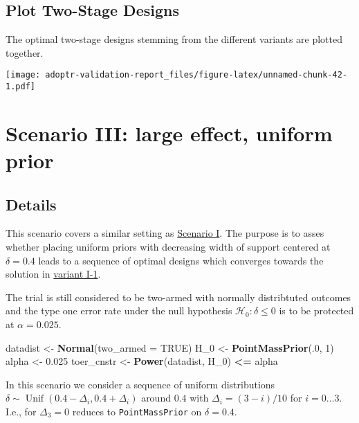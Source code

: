 \documentclass[
]{book}
\newenvironment{Shaded}{\begin{snugshade}}{\end{snugshade}}
\newcommand{\DataTypeTok}[1]{\textcolor[rgb]{0.13,0.29,0.53}{#1}}
\newcommand{\DecValTok}[1]{\textcolor[rgb]{0.00,0.00,0.81}{#1}}
\newcommand{\FloatTok}[1]{\textcolor[rgb]{0.00,0.00,0.81}{#1}}
\newcommand{\KeywordTok}[1]{\textcolor[rgb]{0.13,0.29,0.53}{\textbf{#1}}}
\newcommand{\NormalTok}[1]{#1}
\newcommand{\OperatorTok}[1]{\textcolor[rgb]{0.81,0.36,0.00}{\textbf{#1}}}
\newcommand{\OtherTok}[1]{\textcolor[rgb]{0.56,0.35,0.01}{#1}}
\newcommand{\StringTok}[1]{\textcolor[rgb]{0.31,0.60,0.02}{#1}}
\begin{document}
\hypertarget{plot-two-stage-designs-1}{%
\section{Plot Two-Stage Designs}\label{plot-two-stage-designs-1}}

The optimal two-stage designs stemming from the different variants
are plotted together.

\texttt{[image: adoptr-validation-report\_files/figure-latex/unnamed-chunk-42-1.pdf]}

\hypertarget{scenarioIII}{%
\chapter{Scenario III: large effect, uniform prior}\label{scenarioIII}}

\hypertarget{details-2}{%
\section{Details}\label{details-2}}

This scenario covers a similar setting as \protect\hyperlink{scenarioI}{Scenario I}.
The purpose is to asses whether placing uniform priors with decreasing
width of support centered at \(\delta=0.4\) leads to a sequence of
optimal designs which converges towards the solution in \protect\hyperlink{variantI.1}{variant I-1}.

The trial is still considered to be two-armed with normally distribtuted outcomes
and the type one error rate under the null hypothesis
\(\mathcal{H}_0:\delta \leq 0\) is to be protected at \(\alpha = 0.025\).

\begin{Shaded}
\begin{Highlighting}[]
\NormalTok{datadist   \textless{}{-}}\StringTok{ }\KeywordTok{Normal}\NormalTok{(}\DataTypeTok{two\_armed =} \OtherTok{TRUE}\NormalTok{)}
\NormalTok{H\_}\DecValTok{0}\NormalTok{        \textless{}{-}}\StringTok{ }\KeywordTok{PointMassPrior}\NormalTok{(.}\DecValTok{0}\NormalTok{, }\DecValTok{1}\NormalTok{)}
\NormalTok{alpha      \textless{}{-}}\StringTok{ }\FloatTok{0.025}
\NormalTok{toer\_cnstr \textless{}{-}}\StringTok{ }\KeywordTok{Power}\NormalTok{(datadist, H\_}\DecValTok{0}\NormalTok{) }\OperatorTok{\textless{}=}\StringTok{ }\NormalTok{alpha}
\end{Highlighting}
\end{Shaded}

In this scenario we consider a sequence of uniform distributions
\(\delta\sim\operatorname{Unif}(0.4 - \Delta_i, 0.4 + \Delta_i)\)
around \(0.4\) with \(\Delta_i=(3 - i)/10\) for \(i=0\ldots 3\).
I.e., for \(\Delta_3=0\) reduces to \texttt{PointMassPrior} on \(\delta=0.4\).
\end{document}
